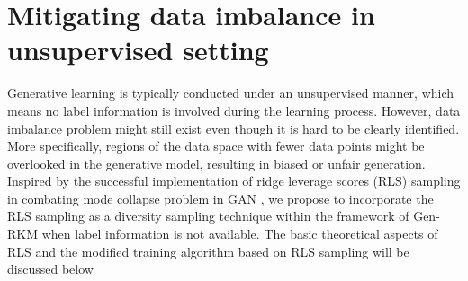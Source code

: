 \section{Mitigating data imbalance in unsupervised setting}
\label{sec-methods-unsupervised}
Generative learning is typically conducted under an unsupervised manner, which means no label information is involved during the learning process. However, data imbalance problem might still exist even though it is hard to be clearly identified. More specifically, regions of the data space with fewer data points might be overlooked in the generative model, resulting in biased or unfair generation.  Inspired by the successful implementation of ridge leverage scores (RLS) sampling in combating mode collapse problem in GAN \cite{schreursLeverageScoreSampling2022}, we propose to incorporate the RLS sampling as a diversity sampling technique within the framework of Gen-RKM when label information is not available. The basic theoretical aspects of RLS and the modified training algorithm based on RLS sampling will be discussed below

